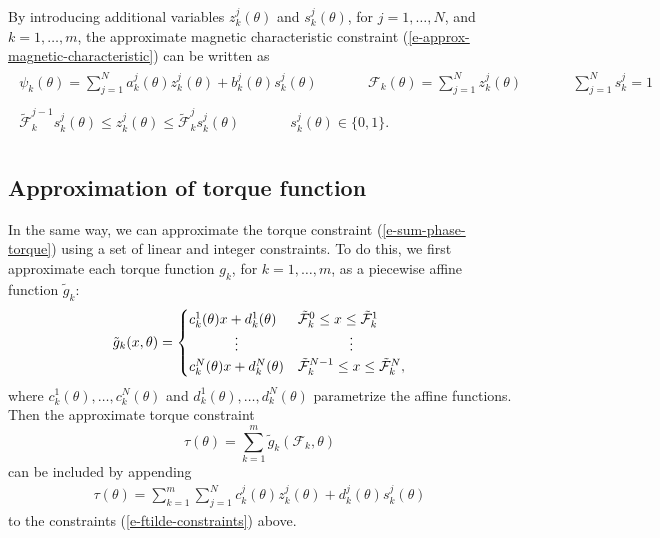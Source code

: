 \documentclass[11pt]{article}
\begin{document}
By introducing additional variables $z_k^j(\theta)$ and $s_k^j(\theta)$,
for $j = 1, \ldots, N$, and $k = 1, \ldots, m$,
the approximate magnetic characteristic constraint (\ref{e-approx-magnetic-characteristic})
can be written as 
\begin{equation}
\label{e-ftilde-constraints}
\begin{gathered}
\begin{aligned}
\psi_k(\theta) = \sum_{j=1}^N a_k^j(\theta) z_k^j(\theta) + b_k^j(\theta) s_k^j(\theta) 
&\qquad&
\mathcal F_k(\theta) = \sum_{j=1}^N z_k^j(\theta)
&\qquad&
\sum_{j=1}^N s_k^j = 1
\end{aligned}
\\
\begin{aligned}
\tilde {\mathcal F}_k^{j-1} s_k^j(\theta) \leq z_k^j(\theta) 
\leq \tilde {\mathcal F}_k^{j} s_k^j(\theta)
&\qquad&
s_k^j(\theta) \in \{0, 1\}.
\end{aligned}
\\
\end{gathered}
\end{equation}

\subsection{Approximation of torque function}
In the same way, we can approximate the torque constraint
(\ref{e-sum-phase-torque})
using a set of linear and integer constraints.
To do this, we first approximate 
each torque function $g_k$, for $k = 1, \ldots, m$,
as a piecewise affine function $\tilde g_k$:
\[
\tilde g_k(x, \theta) = 
\begin{cases}
c_k^{1}(\theta) x + d_k^{1}(\theta) &
\tilde {\mathcal F}_k^{0}  \leq x \leq \tilde {\mathcal F}_k^{1} \\
\hfil \vdots  & \hfil \vdots\\
c_k^{N}(\theta) x + d_k^{N}(\theta) &
\tilde {\mathcal F}_k^{N-1}  \leq x \leq \tilde {\mathcal F}_k^{N},
\end{cases}
\]
where 
$c_k^1(\theta), \ldots, c_k^N(\theta)$
and
$d_k^1(\theta), \ldots, d_k^N(\theta)$
parametrize the affine functions.
Then the approximate torque constraint 
\[
\tau(\theta) = \sum_{k=1}^m \tilde g_k(\mathcal F_k, \theta)
\]
can be included by appending
\begin{align}
\label{e-gtilde-constraints}
\tau(\theta) = \sum_{k=1}^m \sum_{j=1}^N  
   c_k^j(\theta) z_k^j(\theta) + d_k^j(\theta) s_k^j(\theta)
\end{align}
to the constraints (\ref{e-ftilde-constraints}) above.
\end{document}
